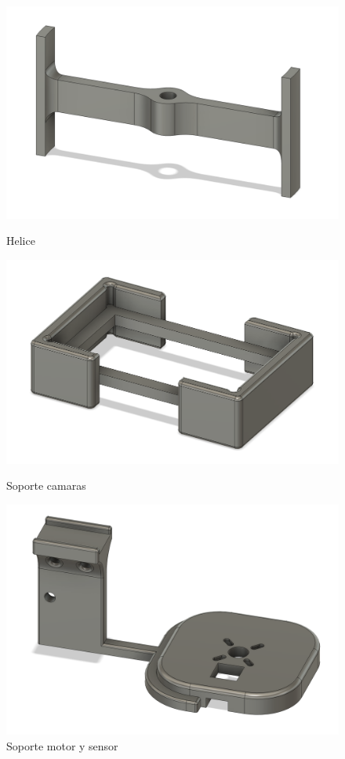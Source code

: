 \documentclass{article}
\begin{document}
\begin{figure}[H]
    \centering
    \begin{minipage}[b]{0.3\textwidth}
      \centering
      \includegraphics[width=\textwidth]{MODELOS/HELICE.png}
      \caption{Helice}
    \end{minipage}
    \begin{minipage}[b]{0.3\textwidth}
      \centering
      \includegraphics[width=\textwidth]{MODELOS/CAMARAS.png}
      \caption{Soporte camaras}
    \end{minipage}
    \begin{minipage}[b]{0.3\textwidth}
      \centering
      \includegraphics[width=\textwidth]{MODELOS/MOTOR.png}
      \caption{Soporte motor y sensor}
    \end{minipage}
\end{figure}
\end{document}
